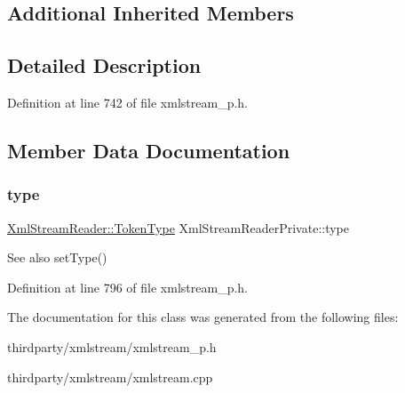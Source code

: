 \subsection*{Additional Inherited Members}


\subsection{Detailed Description}


Definition at line 742 of file xmlstream\+\_\+p.\+h.



\subsection{Member Data Documentation}
\mbox{\label{class_xml_stream_reader_private_a3270b17a74a589cf07bd318d1bcbace7}} 
\subsubsection{\texorpdfstring{type}{type}}
{\footnotesize\ttfamily \hyperlink{class_xml_stream_reader_a99e2023f874f0ca648c996ae79c3b5f7}{Xml\+Stream\+Reader\+::\+Token\+Type} Xml\+Stream\+Reader\+Private\+::type}

\begin{DoxySeeAlso}{See also}
set\+Type() 
\end{DoxySeeAlso}


Definition at line 796 of file xmlstream\+\_\+p.\+h.



The documentation for this class was generated from the following files\+:\begin{DoxyCompactItemize}
\item 
thirdparty/xmlstream/xmlstream\+\_\+p.\+h\item 
thirdparty/xmlstream/xmlstream.\+cpp\end{DoxyCompactItemize}
